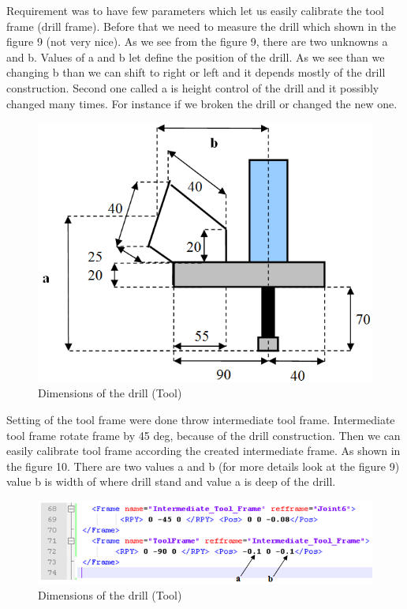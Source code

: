 Requirement was to have few parameters which let us easily calibrate the tool frame (drill frame). Before that we need to measure the drill which shown in the figure 9 (not very nice). As we see from the figure 9, there are two unknowns a and b. Values of a and b let define the position of the drill. As we see than we changing b than we can shift to right or left and it depends mostly of the drill construction. Second one called a is height control of the drill and it possibly changed many times. For instance if we broken the drill or changed the new one. 

\begin{figure}[H]
  \centering
  \includegraphics[scale= 0.6]{source/drillDimensions.png}
  \caption{Dimensions of the drill (Tool)}
  \label{fig:drillDimensions}
\end{figure}

Setting of the tool frame were done throw intermediate tool frame. Intermediate tool frame rotate frame by 45 deg, because of the drill construction.  Then we can easily calibrate tool frame according the created intermediate frame. As shown in the figure 10. There are two values a and b (for more details look at the figure 9) value b is width of where drill stand and value a is deep of the drill.

\begin{figure}[H]
  \centering
  \includegraphics[scale= 0.6]{source/toolCalibrationXML.png}
  \caption{Dimensions of the drill (Tool)}
  \label{fig:toolCalibrationXML}
\end{figure}

